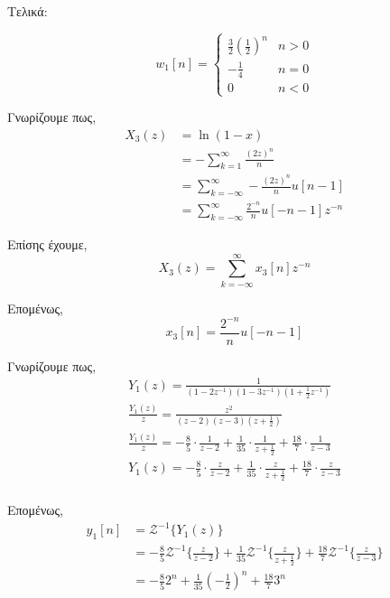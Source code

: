 \documentclass{assignment}
\begin{document}
\begin{answers}
Τελικά:

\begin{equation*}
w_1[n] = \begin{cases}
    \frac{3}{2}\left(\frac{1}{2}\right)^n & n > 0 \\
    -\frac{1}{4} & n = 0 \\
    0 & n < 0
\end{cases}
\end{equation*}

\answer
Γνωρίζουμε πως,
\begin{align*}
X_3(z) &= \ln(1-x) \\
       &= -\sum_{k=1}^{\infty} \frac{(2z)^n}{n} \\
       &= \sum_{k=-\infty}^{\infty} -\frac{(2z)^n}{n} u[n-1] \\
       &= \sum_{k=-\infty}^{\infty} \frac{2^{-n}}{n} u[-n-1] z^{-n}
\end{align*}

Επίσης έχουμε,
\begin{equation*}
X_3(z) = \sum_{k=-\infty}^{\infty} x_3[n] z^{-n}
\end{equation*}

Επομένως,
\begin{equation*}
x_3[n] = \frac{2^{-n}}{n}u[-n-1]
\end{equation*}

\answer

Γνωρίζουμε πως,
\begin{gather*}
Y_1(z) = \frac{1}{(1-2z^{-1})(1-3z^{-1})(1+\frac{1}{2}z^{-1})} \\
\frac{Y_1(z)}{z} = \frac{z^2}{(z-2)(z-3)(z+\frac{1}{2})} \\
\frac{Y_1(z)}{z} = -\frac{8}{5}\cdot\frac{1}{z-2} + \frac{1}{35}\cdot\frac{1}{z+\frac{1}{2}} + \frac{18}{7}\cdot\frac{1}{z-3} \\
Y_1(z) = -\frac{8}{5}\cdot\frac{z}{z-2} + \frac{1}{35}\cdot\frac{z}{z+\frac{1}{2}} + \frac{18}{7}\cdot\frac{z}{z-3} \\
\end{gather*}

Επομένως,
\begin{align*}
y_1[n] &= \mathscr{Z}^{-1}\bigg\{Y_1(z)\bigg\}\\
       &= -\frac{8}{5}\mathscr{Z}^{-1}\bigg\{\frac{z}{z-2}\bigg\} 
          +\frac{1}{35}\mathscr{Z}^{-1}\bigg\{\frac{z}{z+\frac{1}{2}}\bigg\} 
          +\frac{18}{7}\mathscr{Z}^{-1}\bigg\{\frac{z}{z-3}\bigg\} \\
       &= -\frac{8}{5}2^n + \frac{1}{35}\left(-\frac{1}{2}\right)^n +\frac{18}{7}3^n
\end{align*}


\end{answers}
\end{document}
